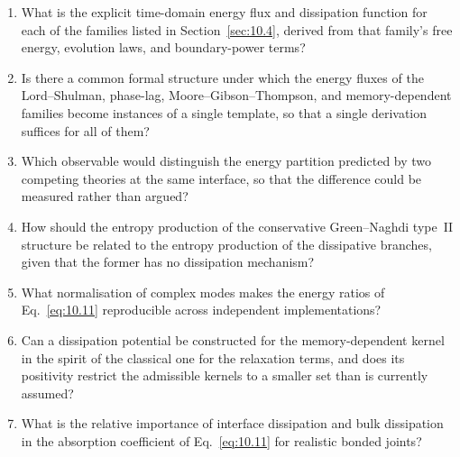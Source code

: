 \begin{enumerate}[label=\textbf{OQ10.\arabic*}]
\item What is the explicit time-domain energy flux and dissipation function for each of the families listed in Section~\ref{sec:10.4}, derived from that family's free energy, evolution laws, and boundary-power terms? \label{oq:10.1}
\item Is there a common formal structure under which the energy fluxes of the Lord--Shulman, phase-lag, Moore--Gibson--Thompson, and memory-dependent families become instances of a single template, so that a single derivation suffices for all of them? \label{oq:10.2}
\item Which observable would distinguish the energy partition predicted by two competing theories at the same interface, so that the difference could be measured rather than argued? \label{oq:10.3}
\item How should the entropy production of the conservative Green--Naghdi type~II structure be related to the entropy production of the dissipative branches, given that the former has no dissipation mechanism? \label{oq:10.4}
\item What normalisation of complex modes makes the energy ratios of Eq.~\eqref{eq:10.11} reproducible across independent implementations? \label{oq:10.5}
\item Can a dissipation potential be constructed for the memory-dependent kernel in the spirit of the classical one for the relaxation terms, and does its positivity restrict the admissible kernels to a smaller set than is currently assumed? \label{oq:10.6}
\item What is the relative importance of interface dissipation and bulk dissipation in the absorption coefficient of Eq.~\eqref{eq:10.11} for realistic bonded joints? \label{oq:10.7}
\end{enumerate}

